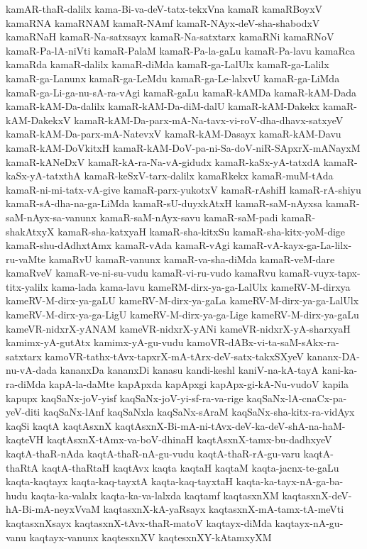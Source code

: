 {kamAR-thaR-dalilx
kama-Bi-va-deV-tatx-tekxVna
kamaR
kamaRBoyxV
kamaRNA
kamaRNAM
kamaR-NAmf
kamaR-NAyx-deV-sha-shabodxV
kamaRNaH
kamaR-Na-satxsayx
kamaR-Na-satxtarx
kamaRNi
kamaRNoV
kamaR-Pa-lA-niVti
kamaR-PalaM
kamaR-Pa-la-gaLu
kamaR-Pa-lavu
kamaRca
kamaRda
kamaR-dalilx
kamaR-diMda
kamaR-ga-LalUlx
kamaR-ga-Lalilx
kamaR-ga-Lanunx
kamaR-ga-LeMdu
kamaR-ga-Le-lalxvU
kamaR-ga-LiMda
kamaR-ga-Li-ga-nu-sA-ra-vAgi
kamaR-gaLu
kamaR-kAMDa
kamaR-kAM-Dada
kamaR-kAM-Da-dalilx
kamaR-kAM-Da-diM-dalU
kamaR-kAM-Dakekx
kamaR-kAM-DakekxV
kamaR-kAM-Da-parx-mA-Na-tavx-vi-roV-dha-dhavx-satxyeV
kamaR-kAM-Da-parx-mA-NatevxV
kamaR-kAM-Dasayx
kamaR-kAM-Davu
kamaR-kAM-DoVkitxH
kamaR-kAM-DoV-pa-ni-Sa-doV-niR-SApxrX-mANayxM
kamaR-kANeDxV
kamaR-kA-ra-Na-vA-gidudx
kamaR-kaSx-yA-tatxdA
kamaR-kaSx-yA-tatxthA
kamaR-keSxV-tarx-dalilx
kamaRkekx
kamaR-muM-tAda
kamaR-ni-mi-tatx-vA-give
kamaR-parx-yukotxV
kamaR-rAshiH
kamaR-rA-shiyu
kamaR-sA-dha-na-ga-LiMda
kamaR-sU-duyxkAtxH
kamaR-saM-nAyxsa
kamaR-saM-nAyx-sa-vanunx
kamaR-saM-nAyx-savu
kamaR-saM-padi
kamaR-shakAtxyX
kamaR-sha-katxyaH
kamaR-sha-kitxSu
kamaR-sha-kitx-yoM-dige
kamaR-shu-dAdhxtAmx
kamaR-vAda
kamaR-vAgi
kamaR-vA-kayx-ga-La-lilx-ru-vaMte
kamaRvU
kamaR-vanunx
kamaR-va-sha-diMda
kamaR-veM-dare
kamaRveV
kamaR-ve-ni-su-vudu
kamaR-vi-ru-vudo
kamaRvu
kamaR-vuyx-tapx-titx-yalilx
kama-lada
kama-lavu
kameRM-dirx-ya-ga-LalUlx
kameRV-M-dirxya
kameRV-M-dirx-ya-gaLU
kameRV-M-dirx-ya-gaLa
kameRV-M-dirx-ya-ga-LalUlx
kameRV-M-dirx-ya-ga-LigU
kameRV-M-dirx-ya-ga-Lige
kameRV-M-dirx-ya-gaLu
kameVR-nidxrX-yANAM
kameVR-nidxrX-yANi
kameVR-nidxrX-yA-sharxyaH
kamimx-yA-gutAtx
kamimx-yA-gu-vudu
kamoVR-dABx-vi-ta-saM-sAkx-ra-satxtarx
kamoVR-tathx-tAvx-tapxrX-mA-tArx-deV-satx-takxSXyeV
kananx-DA-nu-vA-dada
kananxDa
kananxDi
kanasu
kandi-keshl
kaniV-na-kA-tayA
kani-ka-ra-diMda
kapA-la-daMte
kapApxda
kapApxgi
kapApx-gi-kA-Nu-vudoV
kapila
kapupx
kaqSaNx-joV-yisf
kaqSaNx-joV-yi-sf-ra-va-rige
kaqSaNx-lA-cnaCx-pa-yeV-diti
kaqSaNx-lAnf
kaqSaNxla
kaqSaNx-sAraM
kaqSaNx-sha-kitx-ra-vidAyx
kaqSi
kaqtA
kaqtAsxnX
kaqtAsxnX-Bi-mA-ni-tAvx-deV-ka-deV-shA-na-haM-kaqteVH
kaqtAsxnX-tAmx-va-boV-dhinaH
kaqtAsxnX-tamx-bu-dadhxyeV
kaqtA-thaR-nAda
kaqtA-thaR-nA-gu-vudu
kaqtA-thaR-rA-gu-varu
kaqtA-thaRtA
kaqtA-thaRtaH
kaqtAvx
kaqta
kaqtaH
kaqtaM
kaqta-jacnx-te-gaLu
kaqta-kaqtayx
kaqta-kaq-tayxtA
kaqta-kaq-tayxtaH
kaqta-ka-tayx-nA-ga-ba-hudu
kaqta-ka-valalx
kaqta-ka-va-lalxda
kaqtamf
kaqtasxnXM
kaqtasxnX-deV-hA-Bi-mA-neyxVvaM
kaqtasxnX-kA-yaRsayx
kaqtasxnX-mA-tamx-tA-meVti
kaqtasxnXsayx
kaqtasxnX-tAvx-thaR-matoV
kaqtayx-diMda
kaqtayx-nA-gu-vanu
kaqtayx-vanunx
kaqtesxnXV
kaqtesxnXY-kAtamxyXM
}
